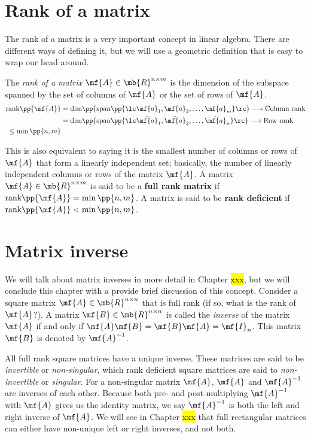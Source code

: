 \section{Rank of a matrix}
The rank of a matrix is a very important concept in linear algebra. There are different ways of defining it, but we will use a geometric definition that is easy to wrap our head around.  

The \textit{rank of a matrix} $\mf{A} \in \mb{R}^{n \times m}$ is the dimension of the subspace spanned by the set of columns of $\mf{A}$ or the set of rows of $\mf{A}$.
\begin{equation}
    \begin{split}
    \text{rank}\pp{\mf{A}} &= \text{dim}\pp{\text{span}\pp{\lc \mf{a}_1, \mf{a}_2, \ldots, \mf {a}_m} \rc} \longrightarrow \text{Column rank}\\ 
    &= \text{dim}\pp{\text{span}\pp{\lc \tilde{\mf{a}}_1, \tilde{\mf{a}}_2, \ldots, \tilde{\mf{a}}_n} \rc} \longrightarrow \text{Row rank} \\
    \leq \min\pp{n, m}
    \end{split}
    \label{eq:ch02-mat-rank}
\end{equation}

This is also equivalent to saying it is the smallest number of columns or rows of $\mf{A}$ that form  a linearly independent set; basically, the number of linearly independent columns or rows of the matrix $\mf{A}$. A matrix $\mf{A} \in \mb{R}^{n \times m}$ is said to be a \textbf{full rank matrix} if $\text{rank}\pp{\mf{A}} = \min\pp{n, m}$. A matrix is said to be \textbf{rank deficient} if $\text{rank}\pp{\mf{A}} < \min\pp{n, m}$.

\section{Matrix inverse}
We will talk about matrix inverses in more detail in Chapter \hl{xxx}, but we will conclude this chapter with a provide brief discussion of this concept. Consider a square matrix $\mf{A} \in \mb{R}^{n \times n}$ that is full rank (if so, what is the rank of $\mf{A}$?). A matrix $\mf{B} \in \mb{R}^{n \times n}$ is called the \textit{inverse} of the matrix $\mf{A}$ if and only if $\mf{A}\mf{B} = \mf{B}\mf{A} = \mf{I}_n$. This matrix $\mf{B}$ is denoted by $\mf{A}^{-1}$. 

All full rank square matrices have a unique inverse. These matrices are said to be \textit{invertible} or \textit{non-singular}, which rank deficient square matrices are said to \textit{non-invertible} or \textit{singular}. For a non-singular matrix $\mf{A}$, $\mf{A}$ and $\mf{A}^{-1}$ are inverses of each other. Because both pre- and post-multiplying $\mf{A}^{-1}$ with $\mf{A}$ gives us the identity matrix, we say $\mf{A}^{-1}$ is both the left and right inverse of $\mf{A}$. We will see in Chapter \hl{xxx} that full rectangular matrices can either have non-unique left or right inverses, and not both.


